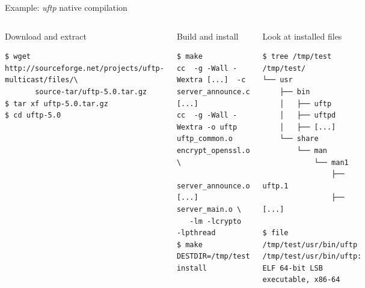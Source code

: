 \begin{frame}[fragile]{Example: {\em uftp} native compilation}
  \begin{columns}
  \begin{block}{Download and extract}
    {\tiny
\begin{verbatim}
$ wget http://sourceforge.net/projects/uftp-multicast/files/\
       source-tar/uftp-5.0.tar.gz
$ tar xf uftp-5.0.tar.gz
$ cd uftp-5.0
\end{verbatim}
    }
  \end{block}

  \begin{block}{Build and install}
    {\tiny
\begin{verbatim}
$ make
cc  -g -Wall -Wextra [...]  -c server_announce.c
[...]
cc  -g -Wall -Wextra -o uftp uftp_common.o encrypt_openssl.o \
   server_announce.o [...] server_main.o \
   -lm -lcrypto  -lpthread
$ make DESTDIR=/tmp/test install
\end{verbatim}
    }
  \end{block}
    \column{0.5\textwidth}
  \begin{block}{Look at installed files}
    {\tiny
\begin{verbatim}
$ tree /tmp/test
/tmp/test/
└── usr
    ├── bin
    │   ├── uftp
    │   ├── uftpd
    │   ├── [...]
    └── share
        └── man
            └── man1
                ├── uftp.1
                ├── [...]

$ file /tmp/test/usr/bin/uftp
/tmp/test/usr/bin/uftp: ELF 64-bit LSB executable, x86-64
\end{verbatim}
    }
  \end{block}
\end{columns}
\end{frame}


